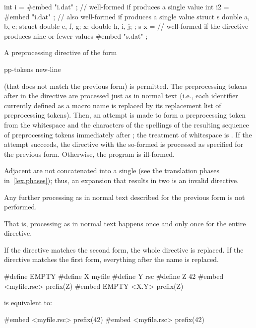 \begin{example}
\begin{codeblock}
int i = {
#embed "i.dat"
};  // well-formed if  produces a single value
int i2 =
#embed "i.dat"
;   // also well-formed if  produces a single value
struct s {
  double a, b, c;
  struct { double e, f, g; } x;
  double h, i, j;
};
s x = {
// well-formed if the directive produces nine or fewer values
#embed "s.dat"
};
\end{codeblock}
\end{example}

\pnum
A preprocessing directive of the form
\begin{ncsimplebnf}
 pp-tokens new-line
\end{ncsimplebnf}
(that does not match the previous form) is permitted.
The preprocessing tokens after  in the directive are processed
just as in normal text (i.e., each identifier currently defined as a macro
name is replaced by its replacement list of preprocessing tokens).
Then, an attempt is made to form a 
preprocessing token from the whitespace and the characters
of the spellings of the resulting sequence of preprocessing tokens immediately after ;
the treatment of whitespace
is .
If the attempt succeeds, the directive with the so-formed 
is processed as specified for the previous form.
Otherwise, the program is ill-formed.
\begin{note}
Adjacent  are not concatenated into a single
 (see the translation phases in~\ref{lex.phases});
thus, an expansion that results in two  is an
invalid directive.
\end{note}
Any further processing as in normal text described for the previous
form is not performed.
\begin{note}
That is, processing as in normal text happens once and only once for the entire
directive.
\end{note}
\begin{example}
If the directive matches the second form, the whole directive is replaced.
If the directive matches the first form, everything after the name is replaced.
\begin{codeblock}
#define EMPTY
#define X myfile
#define Y rsc
#define Z 42
#embed <myfile.rsc> prefix(Z)
#embed EMPTY <X.Y>  prefix(Z)
\end{codeblock}
is equivalent to:
\begin{codeblock}
#embed <myfile.rsc> prefix(42)
#embed <myfile.rsc> prefix(42)
\end{codeblock}
\end{example}

